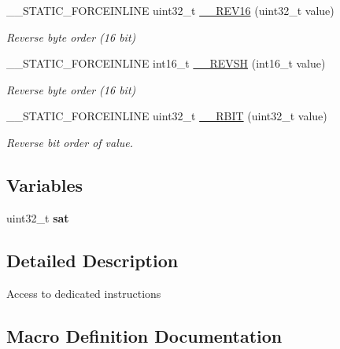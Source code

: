 \begin{DoxyCompactItemize}
\+\_\+\+\_\+\+S\+T\+A\+T\+I\+C\+\_\+\+F\+O\+R\+C\+E\+I\+N\+L\+I\+NE uint32\+\_\+t \hyperlink{group___c_m_s_i_s___core___instruction_interface_gaa12aedd096506c9639c1581acd5c6a78}{\+\_\+\+\_\+\+R\+E\+V16} (uint32\+\_\+t value)
\begin{DoxyCompactList}\small\item\em Reverse byte order (16 bit) \end{DoxyCompactList}\item 
\+\_\+\+\_\+\+S\+T\+A\+T\+I\+C\+\_\+\+F\+O\+R\+C\+E\+I\+N\+L\+I\+NE int16\+\_\+t \hyperlink{group___c_m_s_i_s___core___instruction_interface_gacb695341318226a5f69ed508166622ac}{\+\_\+\+\_\+\+R\+E\+V\+SH} (int16\+\_\+t value)
\begin{DoxyCompactList}\small\item\em Reverse byte order (16 bit) \end{DoxyCompactList}\item 
\+\_\+\+\_\+\+S\+T\+A\+T\+I\+C\+\_\+\+F\+O\+R\+C\+E\+I\+N\+L\+I\+NE uint32\+\_\+t \hyperlink{group___c_m_s_i_s___core___instruction_interface_gaf944a7b7d8fd70164cca27669316bcf7}{\+\_\+\+\_\+\+R\+B\+IT} (uint32\+\_\+t value)
\begin{DoxyCompactList}\small\item\em Reverse bit order of value. \end{DoxyCompactList}\end{DoxyCompactItemize}
\subsection*{Variables}
\begin{DoxyCompactItemize}
\item 
uint32\+\_\+t {\bfseries sat}
\end{DoxyCompactItemize}


\subsection{Detailed Description}
Access to dedicated instructions 

\subsection{Macro Definition Documentation}
\mbox{\label{group___c_m_s_i_s___core___instruction_interface_ga15ea6bd3c507d3e81c3b3a1258e46397}} 
